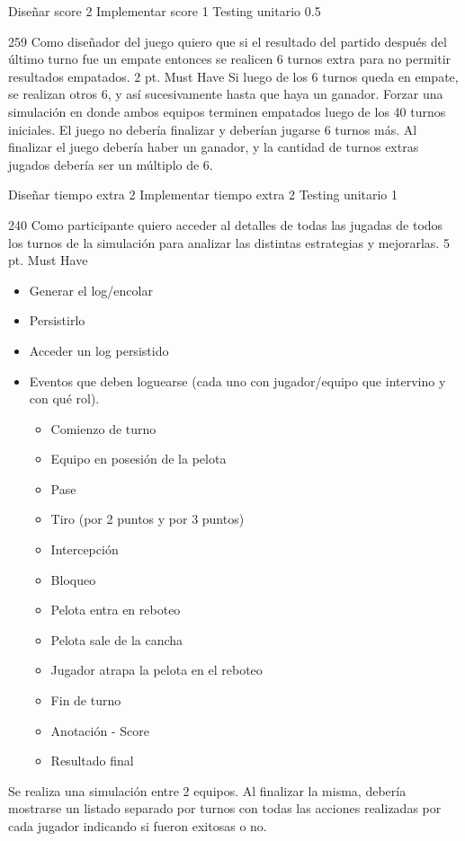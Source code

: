 \begin{taskstable}
 \task
 {Diseñar score}
 {2}
 \task
 {Implementar score}
 {1}
 \task
 {Testing unitario}
 {0.5}
\end{taskstable}

\vspace{1cm}


\sprintstory
{259}
{Como diseñador del juego quiero que si el resultado del partido después del último turno fue un empate entonces se realicen 6 turnos extra para no permitir resultados empatados.}
{2 pt.}
{Must Have}
{Si luego de los 6 turnos queda en empate, se realizan otros 6, y así sucesivamente hasta que haya un ganador.}
{Forzar una simulación en donde ambos equipos terminen empatados luego de los 40 turnos iniciales. El juego no debería finalizar y deberían jugarse 6 turnos más. Al finalizar el juego debería haber un ganador, y la cantidad de turnos extras jugados debería ser un múltiplo de 6.}

\begin{taskstable}
 \task
 {Diseñar tiempo extra}
 {2}
 \task
 {Implementar tiempo extra}
 {2}
 \task
 {Testing unitario}
 {1}
\end{taskstable}

\vspace{1cm}


\sprintstory
{240}
{Como participante quiero acceder al detalles de todas las jugadas de todos los turnos de la simulación para analizar las distintas estrategias y mejorarlas.}
{5 pt.}
{Must Have}
{\begin{itemize}
	\item Generar el log/encolar
	\item Persistirlo
	\item Acceder un log persistido
	\item Eventos que deben loguearse (cada uno con jugador/equipo que intervino y con qué rol).
		\begin{itemize}
			\item Comienzo de turno
			\item Equipo en posesión de la pelota
			\item Pase
			\item Tiro (por 2 puntos y por 3 puntos)
			\item Intercepción
			\item Bloqueo
			\item Pelota entra en reboteo
			\item Pelota sale de la cancha
			\item Jugador atrapa la pelota en el reboteo
			\item Fin de turno
			\item Anotación - Score
			\item Resultado final
		\end{itemize}
\end{itemize}}
{Se realiza una simulación entre 2 equipos. Al finalizar la misma, debería mostrarse un listado separado por turnos con todas las acciones realizadas por cada jugador indicando si fueron exitosas o no.}

